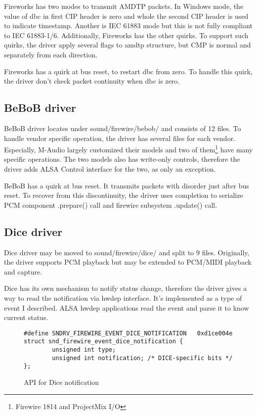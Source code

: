 \documentclass[onecolumn]{article}
\begin{document}
Fireworks has two modes to transmit AMDTP packets. In Windows mode, the value of dbc in first CIP header is zero and whole the second CIP header is used to indicate timestamp. Another is IEC 61883 mode but this is not fully compliant to IEC 61883-1/6. Additionally, Fireworks has the other quirks. To support such quirks, the driver apply several flags to amdtp structure, but CMP is normal and separately from each direction.

Fireworks has a quirk at bus reset, to restart dbc from zero. To handle this quirk, the driver don't check packet continuity when dbc is zero.

\subsection{BeBoB driver}

BeBoB driver locates under sound/firewire/bebob/ and consists of 12 files. To handle vendor specific operation, the driver has several files for each vendor. Especially, M-Audio largely customized their models and two of them\footnote{Firewire 1814 and ProjectMix I/O} have many specific operations. The two models also has write-only controls, therefore the driver adds ALSA Control interface for the two, as only an exception.

BeBoB has a quirk at bus reset. It transmits packets with disorder just after bus reset. To recover from this discontinuity, the driver uses completion to serialize PCM component .prepare() call and firewire subsystem .update() call.

\subsection{Dice driver}

Dice driver may be moved to sound/firewire/dice/ and split to 9 files. Originally, the driver supports PCM playback but may be extended to PCM/MIDI playback and capture.

Dice has its own mechanism to notify status change, therefore the driver gives a way to read the notification via hwdep interface. It's implemented as a type of event I described. ALSA hwdep applications read the event and parse it to know current status.

\begin{figure}[H]
\small
\begin{verbatim}
#define SNDRV_FIREWIRE_EVENT_DICE_NOTIFICATION   0xd1ce004e
struct snd_firewire_event_dice_notification {
        unsigned int type;
        unsigned int notification; /* DICE-specific bits */
};
\end{verbatim}
\caption{API for Dice notification}
\label{uapi-dice-notification}
\end{figure}
\end{document}
